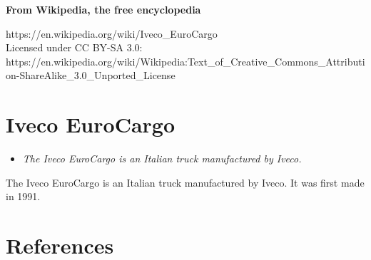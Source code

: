\textbf{From Wikipedia, the free encyclopedia}

https://en.wikipedia.org/wiki/Iveco\_EuroCargo\\
Licensed under CC BY-SA 3.0:\\
https://en.wikipedia.org/wiki/Wikipedia:Text\_of\_Creative\_Commons\_Attribution-ShareAlike\_3.0\_Unported\_License

\section{Iveco EuroCargo}\label{iveco-eurocargo}

\begin{itemize}
\item
  \emph{The Iveco EuroCargo is an Italian truck manufactured by Iveco.}
\end{itemize}

The Iveco EuroCargo is an Italian truck manufactured by Iveco. It was
first made in 1991.

\section{References}\label{references}
